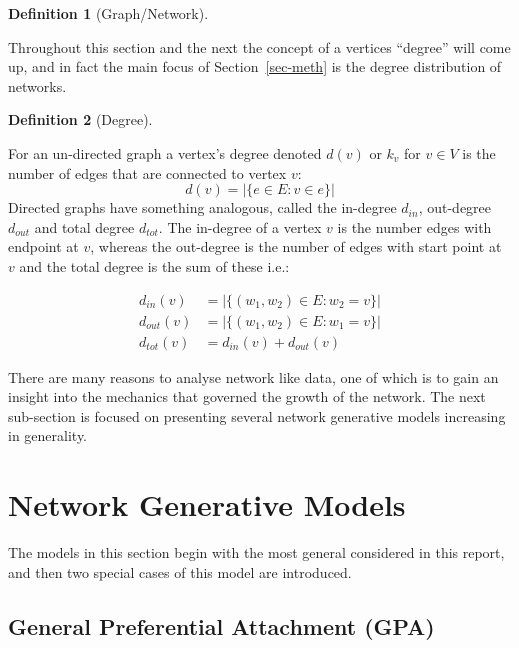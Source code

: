 \documentclass[
  10pt,
  a4paper,
]{scrreprt}
\theoremstyle{definition}
\newtheorem{definition}{Definition}[section]
\theoremstyle{plain}
\theoremstyle{remark}
\begin{document}
{\begin{definition}[Graph/Network]
\end{definition}

Throughout this section and the next the concept of a vertices
``degree'' will come up, and in fact the main focus of
Section~\ref{sec-meth} is the degree distribution of networks.

\begin{definition}[Degree]\protect\hypertarget{def-deg}{}\label{def-deg}

For an un-directed graph a vertex's degree denoted \(d(v)\) or \(k_v\)
for \(v\in V\) is the number of edges that are connected to vertex
\(v\): \[
d(v) = |\{e\in E : v \in e\}|
\] Directed graphs have something analogous, called the in-degree
\(d_{in}\), out-degree \(d_{out}\) and total degree \(d_{tot}\). The
in-degree of a vertex \(v\) is the number edges with endpoint at \(v\),
whereas the out-degree is the number of edges with start point at \(v\)
and the total degree is the sum of these i.e.:

\begin{align*}
d_{in}(v)&= |\{(w_1,w_2)\in E: w_2=v \}|\\
d_{out}(v) &= |\{(w_1,w_2)\in E: w_1=v \}|\\
d_{tot}(v) &= d_{in}(v) + d_{out}(v)
\end{align*}

\end{definition}

There are many reasons to analyse network like data, one of which is to
gain an insight into the mechanics that governed the growth of the
network. The next sub-section is focused on presenting several network
generative models increasing in generality.

\hypertarget{network-generative-models}{%
\section{Network Generative Models}\label{network-generative-models}}

The models in this section begin with the most general considered in
this report, and then two special cases of this model are introduced.

\hypertarget{general-preferential-attachment-gpa}{%
\subsection{General Preferential Attachment
(GPA)}\label{general-preferential-attachment-gpa}}

}
\end{document}
